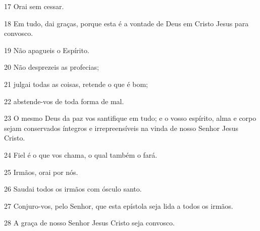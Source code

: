 \par 17 Orai sem cessar.
\par 18 Em tudo, dai graças, porque esta é a vontade de Deus em Cristo Jesus para convosco.
\par 19 Não apagueis o Espírito.
\par 20 Não desprezeis as profecias;
\par 21 julgai todas as coisas, retende o que é bom;
\par 22 abstende-vos de toda forma de mal.
\par 23 O mesmo Deus da paz vos santifique em tudo; e o vosso espírito, alma e corpo sejam conservados íntegros e irrepreensíveis na vinda de nosso Senhor Jesus Cristo.
\par 24 Fiel é o que vos chama, o qual também o fará.
\par 25 Irmãos, orai por nós.
\par 26 Saudai todos os irmãos com ósculo santo.
\par 27 Conjuro-vos, pelo Senhor, que esta epístola seja lida a todos os irmãos.
\par 28 A graça de nosso Senhor Jesus Cristo seja convosco.


